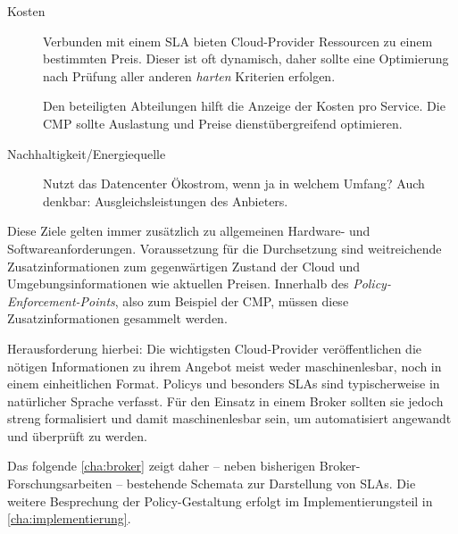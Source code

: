 \begin{description}
	\item[Kosten] Verbunden mit einem SLA bieten Cloud-Provider Ressourcen zu einem bestimmten Preis. Dieser ist oft dynamisch, daher sollte eine Optimierung nach Prüfung aller anderen \emph{harten} Kriterien erfolgen.
	
	Den beteiligten Abteilungen hilft die Anzeige der Kosten pro Service. Die CMP sollte Auslastung und Preise dienstübergreifend optimieren.
	
	\item[Nachhaltigkeit/Energiequelle] Nutzt das Datencenter Ökostrom, wenn ja in welchem Umfang? Auch denkbar: Ausgleichsleistungen des Anbieters.
	
\end{description}

Diese Ziele gelten immer zusätzlich zu allgemeinen Hardware- und Softwareanforderungen. Voraussetzung für die Durchsetzung sind weitreichende Zusatzinformationen zum gegenwärtigen Zustand der Cloud und Umgebungsinformationen wie aktuellen Preisen. Innerhalb des \emph{Policy-Enforcement-Points}, also zum Beispiel der CMP, müssen diese Zusatzinformationen gesammelt werden.

Herausforderung hierbei: Die wichtigsten Cloud-Provider veröffentlichen die nötigen Informationen zu ihrem Angebot meist weder maschinenlesbar, noch in einem einheitlichen Format. Policys und besonders SLAs sind typischerweise in natürlicher Sprache verfasst. Für den Einsatz in einem Broker sollten sie jedoch streng formalisiert und damit maschinenlesbar sein, um automatisiert angewandt und überprüft zu werden.

Das folgende \autoref{cha:broker} zeigt daher -- neben bisherigen Broker-Forschungsarbeiten -- bestehende Schemata zur Darstellung von SLAs. Die weitere Besprechung der Policy-Gestaltung erfolgt im Implementierungsteil in \autoref{cha:implementierung}.
